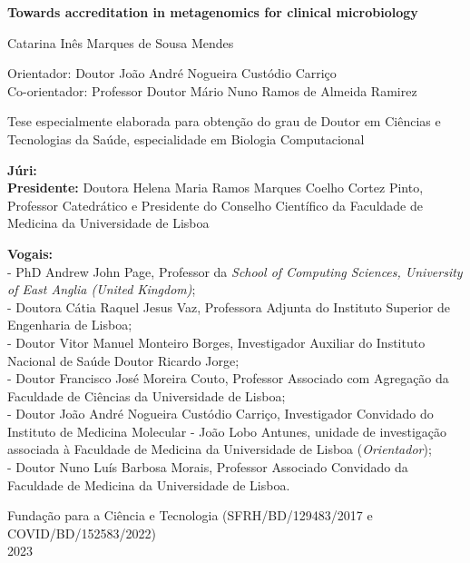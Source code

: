 \begin{titlepage}
\begin{center}
        \vspace{0cm}

        \large
        \textbf{Towards accreditation in metagenomics for clinical microbiology}
        \normalsize
        
        \vspace{0.1cm}
        
        \large
        Catarina Inês Marques de Sousa Mendes
        \normalsize
        
        \vspace{0.1cm}
        
        Orientador: Doutor João André Nogueira Custódio Carriço\\
        Co-orientador: Professor Doutor Mário Nuno Ramos de Almeida Ramirez
        
        \vspace{0.1cm}
        
        Tese especialmente elaborada para obtenção do grau de Doutor em Ciências e Tecnologias da Saúde, especialidade em Biologia Computacional\\


        \end{center}
        \vspace{0cm}

        \small
        \textbf{Júri:}\\
        \textbf{Presidente:} Doutora Helena Maria Ramos Marques Coelho Cortez Pinto, Professor Catedrático e Presidente do Conselho Científico da Faculdade de Medicina da Universidade de Lisboa

        \textbf{Vogais:} \\
        - PhD Andrew John Page, Professor da \textit{School of Computing Sciences, University of East Anglia (United Kingdom)}; \\
        - Doutora Cátia Raquel Jesus Vaz, Professora Adjunta do Instituto Superior de Engenharia de Lisboa; \\
        - Doutor Vitor Manuel Monteiro Borges, Investigador Auxiliar do Instituto Nacional de Saúde Doutor Ricardo Jorge; \\
        - Doutor Francisco José Moreira Couto, Professor Associado com Agregação da Faculdade de Ciências da Universidade de Lisboa; \\
        - Doutor João André Nogueira Custódio Carriço, Investigador Convidado do Instituto de Medicina Molecular - João Lobo Antunes, unidade de investigação associada à Faculdade de Medicina da Universidade de Lisboa (\textit{Orientador}); \\
        - Doutor Nuno Luís Barbosa Morais, Professor Associado Convidado da Faculdade de Medicina da Universidade de Lisboa.
    \begin{center}
        \normalsize
        Fundação para a Ciência e Tecnologia (SFRH/BD/129483/2017 e COVID/BD/152583/2022)\\        
        2023
    \end{center}
\end{titlepage}